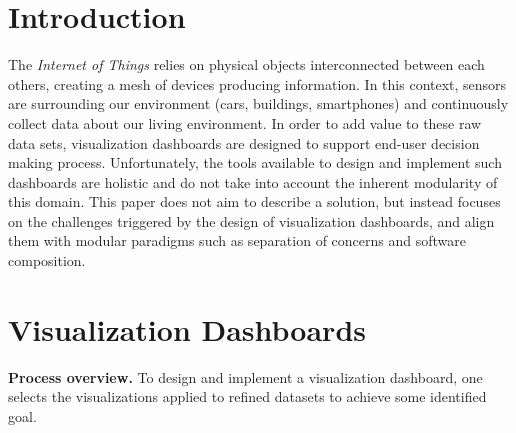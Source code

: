 \documentclass{acm_proc_article-sp}
\begin{document}
\section{Introduction}

The \emph{Internet of Things} relies on physical objects interconnected
between each others, creating a mesh of devices producing
information. In this context, sensors are surrounding our environment
(\eg cars, buildings, smartphones) and continuously collect data about
our living environment. In order to add value to these raw data sets,
visualization dashboards are designed to support end-user decision
making process. Unfortunately, the tools available to design and
implement such dashboards are holistic and do not take into account
the inherent modularity of this domain. This paper does not aim to
describe a solution, but instead focuses on the challenges triggered
by the design of visualization dashboards, and align them with
modular paradigms such as separation of concerns and software
composition.


\section{Visualization Dashboards}
\textbf{Process overview.}
To design and implement a visualization dashboard, one selects the
visualizations applied to refined datasets to achieve some identified
goal. 
\end{document}
